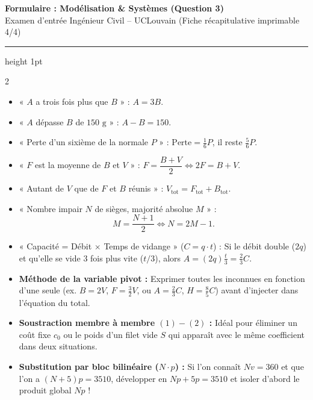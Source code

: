 \begin{center}
    {\LARGE\bfseries\color{uclblue} Formulaire : Modélisation \& Systèmes (Question 3)}\\[2pt]
    {\small\color{darkgray} Examen d'entrée Ingénieur Civil -- UCLouvain (Fiche récapitulative imprimable 4/4)}
    \vspace{2pt}
    \hrule height 1pt
\end{center}
\vspace{-6pt}

{\fontsize{9.5pt}{11.5pt}\selectfont
\setlength{\columnsep}{18pt}
\begin{multicols}{2}

\begin{itemize}[leftmargin=1.2em, itemsep=1.5pt, topsep=2pt]
    \item « $A$ a trois fois plus que $B$ » : $A = 3B$.
    \item « $A$ dépasse $B$ de $150\text{ g}$ » : $A - B = 150$.
    \item « Perte d'un sixième de la normale $P$ » : $\text{Perte} = \frac{1}{6}P$, il reste $\frac{5}{6}P$.
    \item « $F$ est la moyenne de $B$ et $V$ » : $F = \dfrac{B + V}{2} \iff 2F = B + V$.
    \item « Autant de $V$ que de $F$ et $B$ réunis » : $V_{\text{tot}} = F_{\text{tot}} + B_{\text{tot}}$.
    \item « Nombre impair $N$ de sièges, majorité absolue $M$ » :
    \[
        M = \frac{N + 1}{2} \iff N = 2M - 1.
    \]
    \item « Capacité = Débit $\times$ Temps de vidange » ($C = q \cdot t$) :
    Si le débit double ($2q$) et qu'elle se vide $3$ fois plus vite ($t/3$), alors $A = (2q)\frac{t}{3} = \frac{2}{3}C$.
\end{itemize}

\vspace{3pt}
\begin{itemize}[leftmargin=1.2em, itemsep=1.5pt, topsep=2pt]
    \item \textbf{Méthode de la variable pivot :} Exprimer toutes les inconnues en fonction d'une seule (ex. $B = 2V$, $F = \frac{3}{2}V$, ou $A = \frac{2}{3}C$, $H = \frac{8}{5}C$) avant d'injecter dans l'équation du total.
    \item \textbf{Soustraction membre à membre $(1) - (2)$ :} Idéal pour éliminer un coût fixe $c_0$ ou le poids d'un filet vide $S$ qui apparaît avec le même coefficient dans deux situations.
    \item \textbf{Substitution par bloc bilinéaire ($N\cdot p$) :}
    Si l'on connaît $Nv = 360$ et que l'on a $(N + 5)p = 3510$, développer en $Np + 5p = 3510$ et isoler d'abord le produit global $Np$ !
\end{itemize}


\end{multicols}}
